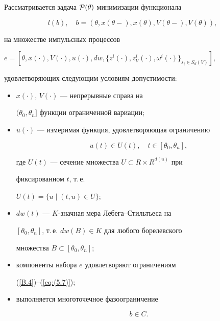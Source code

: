 Рассматривается задача ${\cal P}(\theta)$ минимизации функционала


$$


l(b), \quad b=(\theta,x(\theta-),x(\theta),V(\theta-),V(\theta)),


$$


на множестве импульсных процессов


$e=[\theta, x(\cdot), V(\cdot), u(\cdot), d w,


\{z^i(\cdot),z_V^i(\cdot),\omega^i(\cdot)\}_{s_i\in S_d(V)}],$


удовлетворяющих следующим условиям допустимости:


\begin{itemize}


\item[1)] $x(\cdot)$, $V(\cdot)$ --- непрерывные справа на


$(\theta_0,\theta_n]$ функции ограниченной вариации;


\item[2)] $u(\cdot)$ --- измеримая функция, удовлетворяющая ограничению


$$


u(t) \in U(t),\quad t\in [\theta_0,\theta_n],


$$


где $U(t)$ --- сечение множества $U{\subset} R{\times} R^{d(u)}$ при


фиксированном $t$, т.\,е.


$U(t){=}\{u\mid (t,u){\in} U\};$


\item[3)] $d w(t)$ --- $K$-значная мера Лебега--Стильтьеса на


$[\theta_0,\theta_n]$, т.\,е. $ d w(B) \in K$ для любого борелевского


множества $B \subset [\theta_0,\theta_n]$;


\item[4)] компоненты набора $e$ удовлетворяют ограничениям


(\ref{B.4})--(\ref{eq:(5.7)});


\item[5)] выполняется многоточечное фазоограничение


\begin{equation}


b\in C. \label{eq:(5.44)}


\end{equation}


\end{itemize}





